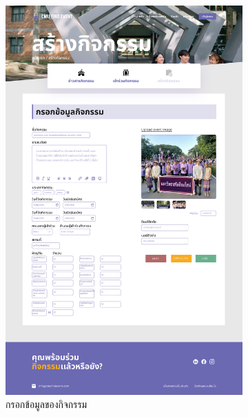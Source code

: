 \begin{figure}[h]
  \centering
  \begin{subfigure}[b]{0.3\linewidth}
    \includegraphics[width=\linewidth]{image/Figma-design/Create-event-join.png}
    \caption{กรอกข้อมูลของกิจกรรม}
  \end{subfigure}
  \hfill
  \begin{subfigure}[b]{0.3\linewidth}

\end{subfigure}
\end{figure}
